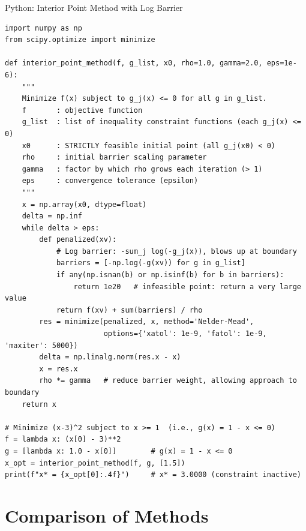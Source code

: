 \documentclass[aspectratio=169,10pt]{beamer}
\begin{document}
\begin{frame}[fragile]{Python: Interior Point Method with Log Barrier}
  \begin{lstlisting}[style=pycode,caption={Interior point method with log barrier for inequality constraints}]
import numpy as np
from scipy.optimize import minimize

def interior_point_method(f, g_list, x0, rho=1.0, gamma=2.0, eps=1e-6):
    """
    Minimize f(x) subject to g_j(x) <= 0 for all g in g_list.
    f       : objective function
    g_list  : list of inequality constraint functions (each g_j(x) <= 0)
    x0      : STRICTLY feasible initial point (all g_j(x0) < 0)
    rho     : initial barrier scaling parameter
    gamma   : factor by which rho grows each iteration (> 1)
    eps     : convergence tolerance (epsilon)
    """
    x = np.array(x0, dtype=float)
    delta = np.inf
    while delta > eps:
        def penalized(xv):
            # Log barrier: -sum_j log(-g_j(x)), blows up at boundary
            barriers = [-np.log(-g(xv)) for g in g_list]
            if any(np.isnan(b) or np.isinf(b) for b in barriers):
                return 1e20   # infeasible point: return a very large value
            return f(xv) + sum(barriers) / rho
        res = minimize(penalized, x, method='Nelder-Mead',
                       options={'xatol': 1e-9, 'fatol': 1e-9, 'maxiter': 5000})
        delta = np.linalg.norm(res.x - x)
        x = res.x
        rho *= gamma   # reduce barrier weight, allowing approach to boundary
    return x

# Minimize (x-3)^2 subject to x >= 1  (i.e., g(x) = 1 - x <= 0)
f = lambda x: (x[0] - 3)**2
g = [lambda x: 1.0 - x[0]]        # g(x) = 1 - x <= 0
x_opt = interior_point_method(f, g, [1.5])
print(f"x* = {x_opt[0]:.4f}")     # x* = 3.0000 (constraint inactive)
  \end{lstlisting}
\end{frame}

\section{Comparison of Methods}
\end{document}
